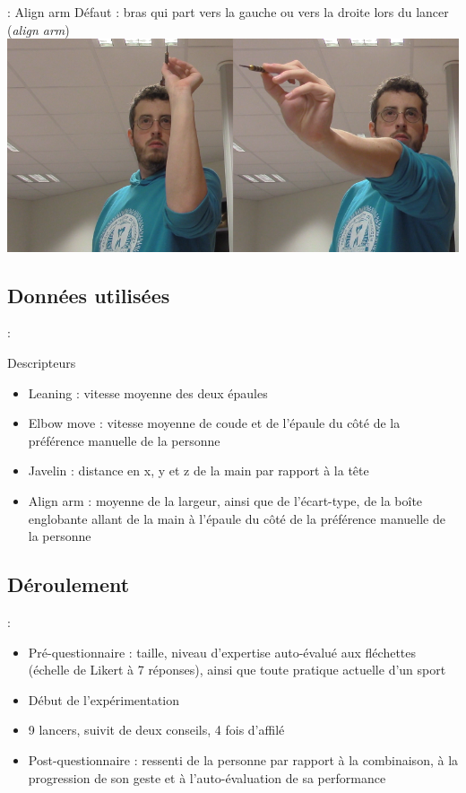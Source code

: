 \documentclass[svgnames]{beamer}
\begin{document}
	\begin{frame}{\subsecname : Align arm}
		Défaut : bras qui part vers la gauche ou vers la droite lors du lancer (\textit{align arm})\\
		\centering
		\includegraphics[scale=0.4]{img/darts_align_arm_final.png}
	\end{frame}
	
	\subsection{Données utilisées}
	\begin{frame}{\secname : \subsecname}
		\begin{block}{Descripteurs}
			\begin{itemize}[label=$\bullet$]
				\item Leaning : vitesse moyenne des deux épaules
				\item Elbow move : vitesse moyenne de coude et de l'épaule du côté de la préférence manuelle de la personne
				\item Javelin : distance en x, y et z de la main par rapport à la tête
				\item Align arm : moyenne de la largeur, ainsi que de l'écart-type, de la boîte englobante allant de la main à l'épaule du côté de la préférence manuelle de la personne
			\end{itemize}
		\end{block}
	\end{frame}
	
	\subsection{Déroulement}
	\begin{frame}{\secname : \subsecname}
		\begin{itemize}[label=$\bullet$]
			\item Pré-questionnaire : taille, niveau d'expertise auto-évalué aux fléchettes (échelle de Likert à 7 réponses), ainsi que toute pratique actuelle d'un sport
			\item Début de l'expérimentation
			\item 9 lancers, suivit de deux conseils, 4 fois d'affilé
			\item Post-questionnaire : ressenti de la personne par rapport à la combinaison, à la progression de son geste et à l'auto-évaluation de sa performance
		\end{itemize}
		
	\end{frame}
	
\end{document}
